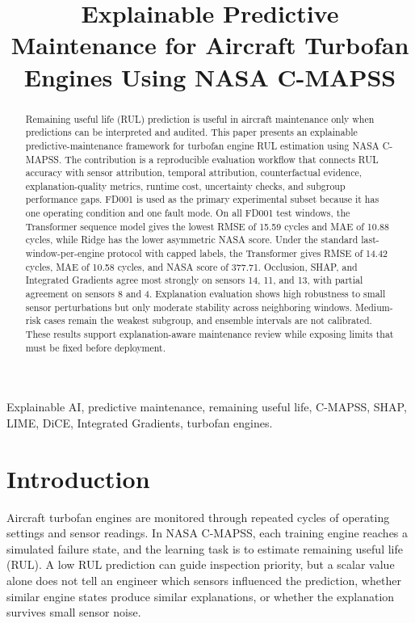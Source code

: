 \documentclass[conference]{IEEEtran}
\title{Explainable Predictive Maintenance for Aircraft Turbofan Engines Using NASA C-MAPSS}
\author{
\IEEEauthorblockN{Ranbir Kumar \quad Kumar Manthan}
\IEEEauthorblockA{Department of Computer Science and Engineering\\
Vellore Institute of Technology Chennai\\
Chennai, India\\
ranbir.kumar2023@vitstudent.ac.in, kumar.manthan2023@vitstudent.ac.in}
}
\begin{document}
\maketitle

\begin{abstract}
Remaining useful life (RUL) prediction is useful in aircraft maintenance only when predictions can be interpreted and audited. This paper presents an explainable predictive-maintenance framework for turbofan engine RUL estimation using NASA C-MAPSS. The contribution is a reproducible evaluation workflow that connects RUL accuracy with sensor attribution, temporal attribution, counterfactual evidence, explanation-quality metrics, runtime cost, uncertainty checks, and subgroup performance gaps. FD001 is used as the primary experimental subset because it has one operating condition and one fault mode. On all FD001 test windows, the Transformer sequence model gives the lowest RMSE of 15.59 cycles and MAE of 10.88 cycles, while Ridge has the lower asymmetric NASA score. Under the standard last-window-per-engine protocol with capped labels, the Transformer gives RMSE of 14.42 cycles, MAE of 10.58 cycles, and NASA score of 377.71. Occlusion, SHAP, and Integrated Gradients agree most strongly on sensors 14, 11, and 13, with partial agreement on sensors 8 and 4. Explanation evaluation shows high robustness to small sensor perturbations but only moderate stability across neighboring windows. Medium-risk cases remain the weakest subgroup, and ensemble intervals are not calibrated. These results support explanation-aware maintenance review while exposing limits that must be fixed before deployment.
\end{abstract}

\begin{IEEEkeywords}
Explainable AI, predictive maintenance, remaining useful life, C-MAPSS, SHAP, LIME, DiCE, Integrated Gradients, turbofan engines.
\end{IEEEkeywords}

\section{Introduction}
Aircraft turbofan engines are monitored through repeated cycles of operating settings and sensor readings. In NASA C-MAPSS, each training engine reaches a simulated failure state, and the learning task is to estimate remaining useful life (RUL). A low RUL prediction can guide inspection priority, but a scalar value alone does not tell an engineer which sensors influenced the prediction, whether similar engine states produce similar explanations, or whether the explanation survives small sensor noise.
\end{document}

